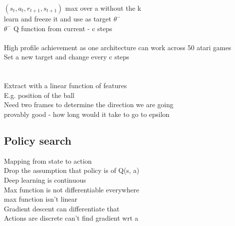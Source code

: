 \documentclass[11pt]{article}
\begin{document}
$(s_t, a_t, r_{t+1}, s_{t+1})$ max over a without the k\\
learn and freeze it and use as target $\theta^{-}$ \\
$\theta^{-}$ Q function from current - c steps\\\\
High profile achievement as one architecture can work across 50 atari games\\
Set a new target and change every c steps\\\\\\
Extract with a linear function of features\\
E.g. position of the ball
\\
Need two frames to determine the direction we are going\\
provably good - how long would it take to go to epsilon
\subsection*{Policy search}
Mapping from state to action\\
Drop the assumption that policy is of Q(s, a)\\
Deep learning is continuous\\
Max function is not differentiable everywhere\\
max function isn't linear\\
Gradient descent can differentiate that
\\
Actions are discrete can't find gradient wrt a
\\
\end{document}

